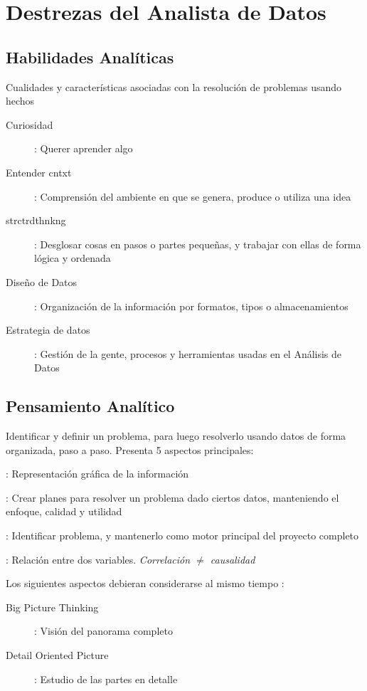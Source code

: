 \section{Destrezas del Analista de Datos}

\subsection{Habilidades Analíticas}
Cualidades y características asociadas con la resolución de problemas usando hechos
\begin{description}
    \item[Curiosidad] : Querer aprender algo
    \item[Entender \gls{cntxt}] : Comprensión del ambiente en que se genera, produce o utiliza una idea
    \item[\gls{strctrdthnkng}] : Desglosar cosas en pasos o partes pequeñas, y trabajar con ellas de forma lógica y ordenada
    \item[Diseño de Datos] : Organización de la información por formatos, tipos o almacenamientos
    \item[Estrategia de datos] : Gestión de la gente, procesos y herramientas usadas en el Análisis de Datos
\end{description}

\subsection{Pensamiento Analítico}
Identificar y definir un problema, para luego resolverlo usando datos de forma organizada, paso a paso. Presenta 5 aspectos principales:
\begin{description}
    \item[Visualización] : Representación gráfica de la información
    \item[Ser Estratégico] : Crear planes para resolver un problema dado ciertos datos, manteniendo el enfoque, calidad y utilidad
    \item[Pensamiento Orientado a Problemas] : Identificar problema, y mantenerlo como motor principal del proyecto completo
    \item[Correlación] : Relación entre dos variables. \textit{Correlación ${\neq}$ causalidad}
    \item{Los siguientes aspectos debieran considerarse al mismo tiempo :
    \begin{description}
        \item[Big Picture Thinking] : Visión del panorama completo
        \item[Detail Oriented Picture] : Estudio de las partes en detalle
    \end{description}}
\end{description}

